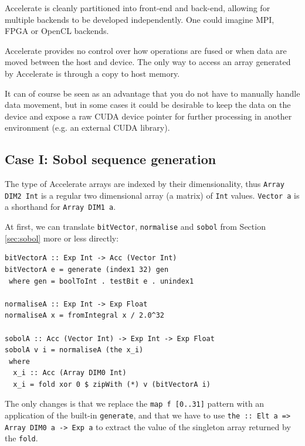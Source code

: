 \documentclass[preprint]{sigplanconf}
\begin{document}

Accelerate is cleanly partitioned into front-end and back-end,
allowing for multiple backends to be developed independently. One
could imagine MPI, FPGA or OpenCL backends.

Accelerate provides no control over how operations are fused or when
data are moved between the host and device. The only way to access an
array generated by Accelerate is through a copy to host memory.

It can of course be seen as an advantage that you do not have to
manually handle data movement, but in some cases it could be desirable
to keep the data on the device and expose a raw CUDA device pointer
for further processing in another environment (e.g. an external CUDA
library).

\subsection{Case I: Sobol sequence generation}
The type of Accelerate arrays are indexed by their dimensionality,
thus \verb|Array DIM2 Int| is a regular two dimensional array (a
matrix) of \verb|Int| values.  \verb|Vector a| is a shorthand for
\verb|Array DIM1 a|.

At first, we can translate \verb|bitVector|, \verb|normalise| and
\verb|sobol| from Section \ref{sec:sobol} more or less directly:
\begin{verbatim}
bitVectorA :: Exp Int -> Acc (Vector Int)
bitVectorA e = generate (index1 32) gen
 where gen = boolToInt . testBit e . unindex1

normaliseA :: Exp Int -> Exp Float
normaliseA x = fromIntegral x / 2.0^32

sobolA :: Acc (Vector Int) -> Exp Int -> Exp Float
sobolA v i = normaliseA (the x_i)
 where
  x_i :: Acc (Array DIM0 Int)
  x_i = fold xor 0 $ zipWith (*) v (bitVectorA i)
\end{verbatim}
The only changes is that we replace the \verb|map f [0..31]| pattern
with an application of the built-in \verb|generate|, and that we have
to use \verb|the :: Elt a => Array DIM0 a -> Exp a| to extract the
value of the singleton array returned by the \verb|fold|.
\end{document}
